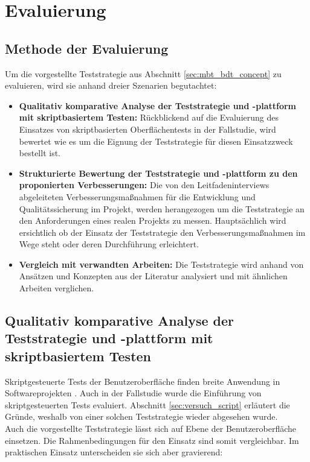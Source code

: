 \chapter{Evaluierung}
\label{sec:mbt_bdt}
\section{Methode der Evaluierung}
Um die vorgestellte Teststrategie aus Abschnitt \ref{sec:mbt_bdt_concept} zu evaluieren, wird sie anhand dreier Szenarien begutachtet: 

\begin{itemize}
\item \textbf{Qualitativ komparative Analyse der Teststrategie und -plattform mit skriptbasiertem Testen:} Rückblickend auf die Evaluierung des Einsatzes von skriptbasierten Oberflächentests in der Fallstudie, wird bewertet wie es um die Eignung der Teststrategie für diesen Einsatzzweck bestellt ist.
\item \textbf{Strukturierte Bewertung der Teststrategie und -plattform zu den proponierten Verbesserungen:} Die von den Leitfadeninterviews abgeleiteten Verbesserungsmaßnahmen für die Entwicklung und Qualitätssicherung im Projekt, werden herangezogen um die Teststrategie an den Anforderungen eines realen Projekts zu messen. Hauptsächlich wird ersichtlich ob der Einsatz der Teststrategie den Verbesserungsmaßnahmen im Wege steht oder deren Durchführung erleichtert.
\item \textbf{Vergleich mit verwandten Arbeiten:} Die Teststrategie wird anhand von Ansätzen und Konzepten aus der Literatur analysiert und mit ähnlichen Arbeiten verglichen. 
\end{itemize}

\section[Qualitativ komparative Analyse der Teststrategie]{Qualitativ komparative Analyse der Teststrategie und -plattform mit skriptbasiertem Testen}

Skriptgesteuerte Tests der Benutzeroberfläche finden breite Anwendung in Softwareprojekten \cite{graham_experiences_2012}. Auch in der Fallstudie wurde die Einführung von skriptgesteuerten Tests evaluiert. Abschnitt \ref{sec:versuch_script} erläutert die Gründe, weshalb von einer solchen Teststrategie wieder abgesehen wurde.\\
Auch die vorgestellte Teststrategie lässt sich auf Ebene der Benutzeroberfläche einsetzen. Die Rahmenbedingungen für den Einsatz sind somit vergleichbar. Im praktischen Einsatz unterscheiden sie sich aber gravierend:

